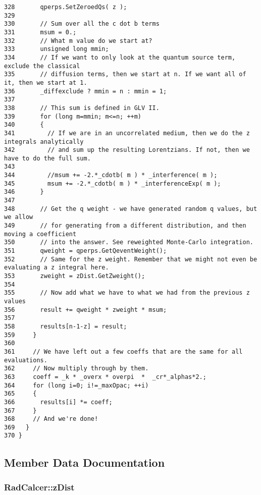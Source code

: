 \begin{Code}
\begin{verbatim}
328       qperps.SetZeroedQs( z );
329 
330       // Sum over all the c dot b terms
331       msum = 0.;
332       // What m value do we start at?
333       unsigned long mmin;
334       // If we want to only look at the quantum source term, exclude the classical
335       // diffusion terms, then we start at n. If we want all of it, then we start at 1.
336       _diffexclude ? mmin = n : mmin = 1;
337 
338       // This sum is defined in GLV II.
339       for (long m=mmin; m<=n; ++m)
340       {
341         // If we are in an uncorrelated medium, then we do the z integrals analytically
342         // and sum up the resulting Lorentzians. If not, then we have to do the full sum.
343 
344         //msum += -2.*_cdotb( m ) * _interference( m );
345         msum += -2.*_cdotb( m ) * _interferenceExp( m );
346       }
347 
348       // Get the q weight - we have generated random q values, but we allow
349       // for generating from a different distribution, and then moving a coefficient
350       // into the answer. See reweighted Monte-Carlo integration.
351       qweight = qperps.GetQeventWeight();
352       // Same for the z weight. Remember that we might not even be evaluating a z integral here.
353       zweight = zDist.GetZweight();
354 
355       // Now add what we have to what we had from the previous z values
356       result += qweight * zweight * msum;
357 
358       results[n-1-z] = result;
359     }
360     
361     // We have left out a few coeffs that are the same for all evaluations.
362     // Now multiply through by them.
363     coeff = _k * _overx * overpi  *  _cr*_alphas*2.;
364     for (long i=0; i!=_maxOpac; ++i)
365     {
366       results[i] *= coeff;
367     }
368     // And we're done!
369   }
370 }
\end{verbatim}
\end{Code}




\subsection{Member Data Documentation}
\subsubsection{ {\bf RadCalcer::zDist}\hspace{0.3cm}{\tt  [private]}}\label{classRadCalcer_82e85452c812ca6fb30ed6dbddb8b31c}




